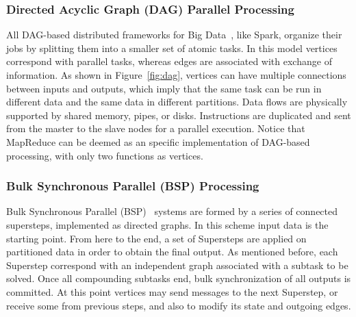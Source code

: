 \documentclass[3p,review]{elsarticle}
\begin{document}
\subsubsection{Directed Acyclic Graph (DAG) Parallel Processing}
All DAG-based distributed frameworks for Big Data~\cite{dennis74}, like Spark, organize their jobs by splitting them into a smaller set of atomic tasks. In this model vertices correspond with parallel tasks, whereas edges are associated with exchange of information. As shown in Figure~\ref{fig:dag}, vertices can have multiple connections between inputs and outputs, which imply that the same task can be run in different data and the same data in different partitions. Data flows are physically supported by shared memory, pipes, or disks. Instructions are duplicated and sent from the master to the slave nodes for a parallel execution. Notice that MapReduce can be deemed as an specific implementation of DAG-based processing, with only two functions as vertices. 



\subsubsection{Bulk Synchronous Parallel (BSP) Processing}

Bulk Synchronous Parallel (BSP)~\cite{vali90} systems are formed by a series of connected supersteps, implemented as directed graphs. In this scheme input data is the starting point. From here to the end, a set of Supersteps are applied on partitioned data in order to obtain the final output. As mentioned before, each Superstep correspond with an independent graph associated with a subtask to be solved. Once all compounding subtasks end, bulk synchronization of all outputs is committed. At this point vertices may send messages to the next Superstep, or receive some from previous steps, and also to modify its state and outgoing edges. 
\end{document}
